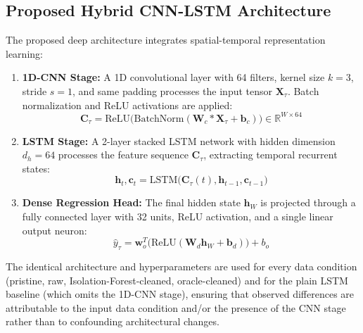 \documentclass[conference]{IEEEtran}
\begin{document}
\subsection{Proposed Hybrid CNN-LSTM Architecture}
The proposed deep architecture integrates spatial-temporal representation learning:
\begin{enumerate}
    \item \textbf{1D-CNN Stage:} A 1D convolutional layer with 64 filters, kernel size $k=3$, stride $s=1$, and same padding processes the input tensor $\mathbf{X}_\tau$. Batch normalization and ReLU activations are applied:
    \begin{equation}
    \mathbf{C}_\tau = \text{ReLU}\big(\text{BatchNorm}(\mathbf{W}_c * \mathbf{X}_\tau + \mathbf{b}_c)\big) \in \mathbb{R}^{W \times 64}
    \end{equation}
    \item \textbf{LSTM Stage:} A 2-layer stacked LSTM network with hidden dimension $d_h=64$ processes the feature sequence $\mathbf{C}_\tau$, extracting temporal recurrent states:
    \begin{equation}
    \mathbf{h}_t, \mathbf{c}_t = \text{LSTM}\big(\mathbf{C}_\tau(t), \mathbf{h}_{t-1}, \mathbf{c}_{t-1}\big)
    \end{equation}
    \item \textbf{Dense Regression Head:} The final hidden state $\mathbf{h}_W$ is projected through a fully connected layer with 32 units, ReLU activation, and a single linear output neuron:
    \begin{equation}
    \hat{y}_\tau = \mathbf{w}_o^T\big(\text{ReLU}(\mathbf{W}_d \mathbf{h}_W + \mathbf{b}_d)\big) + b_o
    \end{equation}
\end{enumerate}
The identical architecture and hyperparameters are used for every data condition (pristine, raw, Isolation-Forest-cleaned, oracle-cleaned) and for the plain LSTM baseline (which omits the 1D-CNN stage), ensuring that observed differences are attributable to the input data condition and/or the presence of the CNN stage rather than to confounding architectural changes.
\end{document}
